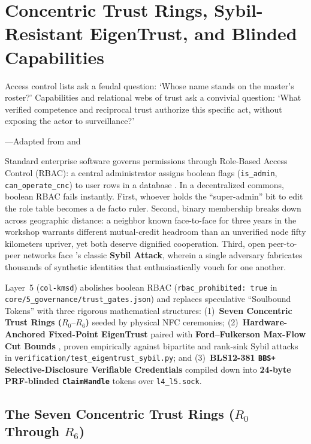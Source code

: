 \chapter{Concentric Trust Rings, Sybil-Resistant EigenTrust, and Blinded Capabilities}
\label{ch:l5-trust-rings}

\epigraph{Access control lists ask a feudal question: `Whose name stands on the master's roster?' Capabilities and relational webs of trust ask a convivial question: `What verified competence and reciprocal trust authorize this specific act, without exposing the actor to surveillance?'}{---Adapted from \textcite{miller2006robust} and \textcite{illich1973}}

Standard enterprise software governs permissions through Role-Based Access Control (RBAC): a
central administrator assigns boolean flags (\texttt{is\_admin}, \texttt{can\_operate\_cnc}) to
user rows in a database \parencite{saltzer1975protection}. In a decentralized commons, boolean
RBAC fails instantly. First, whoever holds the ``super-admin'' bit to edit the role table becomes
a de facto ruler. Second, binary membership breaks down across geographic distance: a neighbor
known face-to-face for three years in the workshop warrants different mutual-credit headroom than
an unverified node fifty kilometers upriver, yet both deserve dignified cooperation. Third,
open peer-to-peer networks face \textcite{douceur2002sybil}'s classic \textbf{Sybil Attack}, wherein a
single adversary fabricates thousands of synthetic identities that enthusiastically vouch for one
another.

Layer~5 (\texttt{col-kmsd}) abolishes boolean RBAC (\texttt{rbac\_prohibited: true} in
\texttt{core/5\_governance/trust\_gates.json}) and replaces speculative ``Soulbound Tokens''
with three rigorous mathematical structures: (1)~\textbf{Seven Concentric Trust Rings
($R_0\text{--}R_6$)} seeded by physical NFC ceremonies; (2)~\textbf{Hardware-Anchored Fixed-Point
EigenTrust} \parencite{kamvar2003} paired with \textbf{Ford--Fulkerson Max-Flow Cut Bounds}
\parencite{ford1956maximal}, proven empirically against bipartite and rank-sink Sybil attacks in
\texttt{verification/test\_eigentrust\_sybil.py}; and (3)~\textbf{BLS12-381 \texttt{BBS+}
Selective-Disclosure Verifiable Credentials} \parencite{camenisch2004signature,w3c2022vc}
compiled down into \textbf{24-byte PRF-blinded \texttt{ClaimHandle}} tokens over
\texttt{l4\_l5.sock}.

\section{The Seven Concentric Trust Rings ($R_0$ Through $R_6$)}
\label{sec:ch3-concentric-rings}

